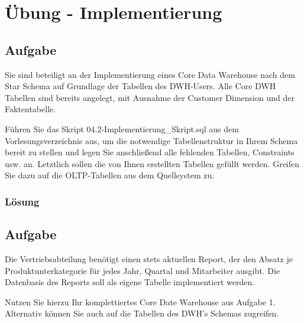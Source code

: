 \section{Übung - Implementierung}
\label{sec:uebung_05}

\subsection{Aufgabe}
\label{sec:uebung_05.aufgabe_01}
Sie sind beteiligt an der Implementierung eines Core Data Warehouse nach dem Star Schema auf Grundlage der Tabellen des DWH-Users. Alle Core DWH Tabellen sind bereits angelegt, mit Ausnahme der Customer Dimension und der Faktentabelle.

Führen Sie das Skript 04.2-Implementierung\_Skript.sql aus dem Vorlesungsverzeichnis aus, um die notwendige Tabellenstruktur in Ihrem Schema bereit zu stellen und legen Sie anschließend alle fehlenden Tabellen, Constraints usw. an. Letztlich sollen die von Ihnen erstellten Tabellen gefüllt werden. Greifen Sie dazu auf die OLTP-Tabellen aus dem Quellsystem zu.

\subsubsection*{Lösung}
\label{sec:uebung_05.aufgabe_01.loesung}

\subsection{Aufgabe}
\label{sec:uebung_05.aufgabe_02}
Die Vertriebsabteilung benötigt einen stets aktuellen Report, der den Absatz je Produktunterkategorie für jedes Jahr, Quartal und Mitarbeiter ausgibt. Die Datenbasis des Reports soll als eigene Tabelle implementiert werden.

Nutzen Sie hierzu Ihr komplettiertes Core Date Warehouse aus Aufgabe 1. Alternativ können Sie auch auf die Tabellen des DWH's Schemas zugreifen.

